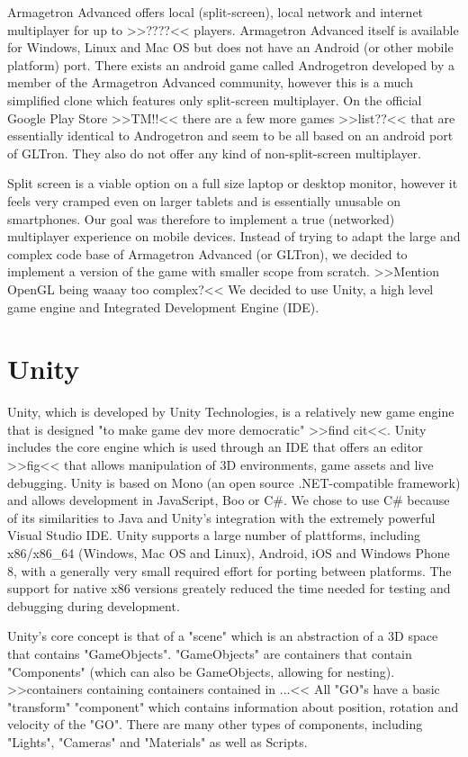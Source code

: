 \documentclass{report}
\begin{document}
Armagetron Advanced offers local (split-screen), local network and internet multiplayer for up to >>????<< players. 
Armagetron Advanced itself is available for Windows, Linux and Mac OS but does not have an Android (or other mobile platform) port. There exists an android game called Androgetron developed by a member of the Armagetron Advanced community, however this is a much simplified clone  which features only split-screen multiplayer. On the official Google Play Store >>TM!!<< there are a few more games >>list??<< that are essentially identical to Androgetron and seem to be all based on an android port of GLTron. They also do not offer any kind of non-split-screen multiplayer.

Split screen is a viable option on a full size laptop or desktop monitor, however it feels very cramped even on larger tablets and is essentially unusable on smartphones.
Our goal was therefore to implement a true (networked) multiplayer experience on mobile devices.
Instead of trying to adapt the large and complex code base of Armagetron Advanced (or GLTron), we decided to implement a version of the game with smaller scope from scratch.
>>Mention OpenGL being waaay too complex?<<
We decided to use Unity, a high level game engine and Integrated Development Engine (IDE).


\section{Unity}
Unity, which is developed by Unity Technologies, is a relatively new game engine that is designed "to make game dev more democratic" >>find cit<<.
Unity includes the core engine which is used through an IDE that offers an editor >>fig<< that allows manipulation of 3D environments, game assets and live debugging.
Unity is based on Mono (an open source .NET-compatible framework) and allows development in JavaScript, Boo or C\#. 
We chose to use C\# because of its similarities to Java and Unity's integration with the extremely powerful Visual Studio IDE.
Unity supports a large number of plattforms, including x86/x86\_64 (Windows, Mac OS and Linux), Android, iOS and Windows Phone 8, with a generally very small required effort for porting between platforms.
The support for native x86 versions greately reduced the time needed for testing and debugging during development.

Unity's core concept is that of a "scene" which is an abstraction of a 3D space that contains "GameObjects".
"GameObjects" are containers that contain "Components" (which can also be GameObjects, allowing for nesting).
>>containers containing containers contained in ...<<
All "GO"s have a basic "transform" "component" which contains information about position, rotation and velocity of the "GO". There are many other types of components, including "Lights", "Cameras" and "Materials" as well as Scripts.
\end{document}
